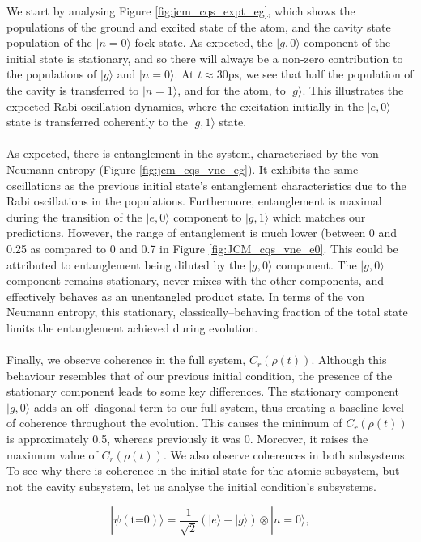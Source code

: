 \documentclass[11pt]{article}
\begin{document}
\noindent We start by analysing Figure \ref{fig:jcm_cqs_expt_eg}, which shows the populations of the ground and excited state of the atom, and the cavity state population of the $|n=0\rangle$ fock state. As expected, the $|g,0\rangle$ component of the initial state is stationary, and so there will always be a non-zero contribution to the populations of $|g\rangle$ and $|n=0\rangle$. At $t\approx 30\text{ps}$, we see that half the population of the cavity is transferred to $|n=1\rangle$, and for the atom, to $|g\rangle$. This illustrates the expected Rabi oscillation dynamics, where the excitation initially in the $|e,0\rangle$ state is transferred coherently to the $|g,1\rangle$ state. \\
\\
As expected, there is entanglement in the system, characterised by the von Neumann entropy (Figure \ref{fig:jcm_cqs_vne_eg}). It exhibits the same oscillations as the previous initial state's entanglement characteristics due to the Rabi oscillations in the populations. Furthermore, entanglement is maximal during the transition of the $|e,0\rangle$ component to $|g,1\rangle$ which matches our predictions. However, the range of entanglement is much lower (between 0 and 0.25 as compared to 0 and 0.7 in Figure \ref{fig:JCM_cqs_vne_e0}. This could be attributed to entanglement being diluted by the $|g,0\rangle$ component. The $|g,0\rangle$ component remains stationary, never mixes with the other components, and effectively behaves as an unentangled product state.
In terms of the von Neumann entropy, this stationary, classically--behaving fraction of the total state limits the entanglement achieved during evolution.\\
\\
Finally, we observe coherence in the full system, $C_r(\rho(t))$. Although this behaviour resembles that of our previous initial condition,  the presence of the stationary component leads to some key differences. The stationary component $|g,0\rangle$ adds an off--diagonal term to our full system, thus creating a baseline level of coherence throughout the evolution. This causes the minimum of $C_r(\rho(t))$ is approximately 0.5, whereas previously it was 0. Moreover, it raises the maximum value of $C_r(\rho(t))$. We also observe coherences in both subsystems. To see why there is coherence in the initial state for the atomic subsystem, but not the cavity subsystem, let us analyse the initial condition's subsystems.

\begin{equation*}
    |\psi (\text{t=0})\rangle = \frac{1}{\sqrt{2}}(|e\rangle + |g\rangle)\otimes|n=0\rangle,
\end{equation*}
\end{document}
